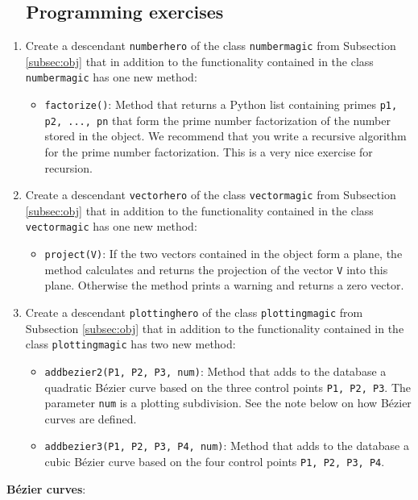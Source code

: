 \subsection{\ \ Programming exercises}

\begin{enumerate}
\item Create a descendant {\tt numberhero} of the class {\tt numbermagic} from Subsection \ref{subsec:obj}
      that in addition to the functionality contained in the class {\tt numbermagic} has one new
      method:
\begin{itemize}
\item {\tt factorize()}: Method that returns a Python list containing primes {\tt p1, p2, ..., pn}
      that form the prime number factorization of the number stored in the object. We recommend 
      that you write a recursive algorithm for the prime number factorization. This is a very 
      nice exercise for recursion.
\end{itemize}
\item Create a descendant {\tt vectorhero} of the class {\tt vectormagic} from Subsection \ref{subsec:obj}
      that in addition to the functionality contained in the class {\tt vectormagic} has one new
      method:
\begin{itemize}
\item {\tt project(V)}: If the two vectors contained in the object form a plane, the 
      method calculates and returns the projection of the vector {\tt V} into this plane. 
      Otherwise the method prints a warning and returns a zero vector. 
\end{itemize}
\item Create a descendant {\tt plottinghero} of the class {\tt plottingmagic} from Subsection \ref{subsec:obj}
      that in addition to the functionality contained in the class {\tt plottingmagic} has two new
      method:
\begin{itemize}
\item {\tt addbezier2(P1, P2, P3, num)}: Method that adds to the database a quadratic B\'ezier curve based 
      on the three control points {\tt P1, P2, P3}. The parameter {\tt num} is a plotting subdivision. 
      See the note below on how B\'ezier curves are defined.
\item {\tt addbezier3(P1, P2, P3, P4, num)}: Method that adds to the database a cubic B\'ezier curve based 
      on the four control points {\tt P1, P2, P3, P4}. 
\end{itemize}
\end{enumerate}
\noindent
{\bf B\'ezier curves}: 

